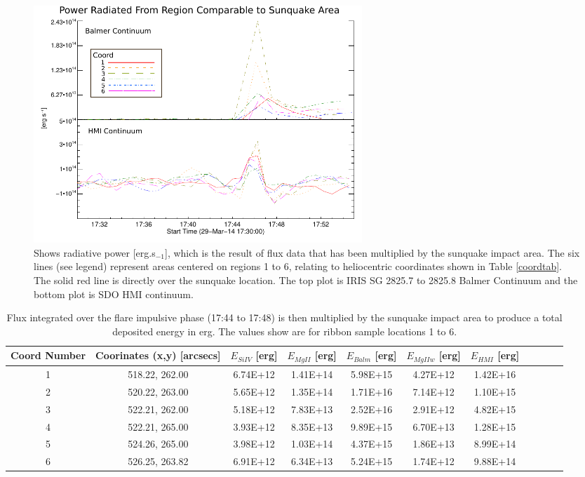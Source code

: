 \begin{figure}[H]
  \begin{center}
  \includegraphics[width=0.6\textwidth]{29-Mar-14-A_sqk-Power-Ladder-Balm-HMI-Only}
  \end{center}
  \caption{Shows radiative power [erg.s$_{-1}$], which is the result of flux data that has been multiplied by the sunquake impact area. The six lines (see legend) represent areas centered on regions 1 to 6, relating to heliocentric coordinates shown in Table \ref{coordtab}. The solid red line is directly over the sunquake location. The top plot is IRIS SG  2825.7 to 2825.8 Balmer Continuum and the bottom plot is SDO HMI continuum.}\label{powerladder-balm-hmi-only}
\end{figure}




\begin{table}[h]
\centering
\begin{tabular}{|c|c|c|c|c|c|c|c|c|c|c|}
Coord Number & Coorinates (x,y) [arcsecs] & $E_{Si IV}$ [erg] & $E_{Mg II}$ [erg] & $E_{Balm}$ [erg] & $E_{Mg II w}$ [erg] & $E_{HMI}$ [erg]\\
\hline
1 & 518.22, 262.00 & 6.74E+12 & 1.41E+14 & 5.98E+15 & 4.27E+12 & 1.42E+16\\
2 & 520.22, 263.00 & 5.65E+12 & 1.35E+14 & 1.71E+16 & 7.14E+12 & 1.10E+15\\
3 & 522.21, 262.00 & 5.18E+12 & 7.83E+13 & 2.52E+16 & 2.91E+12 & 4.82E+15\\
4 & 522.21, 265.00 & 3.93E+12 & 8.35E+13 & 9.89E+15 & 6.70E+13 & 1.28E+15\\
5 & 524.26, 265.00 & 3.98E+12 & 1.03E+14 & 4.37E+15 & 1.86E+13 & 8.99E+14\\
6 & 526.25, 263.82 & 6.91E+12 & 6.34E+13 & 5.24E+15 & 1.74E+12 & 9.88E+14\\
\end{tabular}
\caption{Flux integrated over the flare impulsive phase (17:44 to 17:48) is then multiplied by the sunquake impact area to produce a total deposited energy in erg. The values show are for ribbon sample locations 1 to 6.}\label{eimp}
\end{table}





